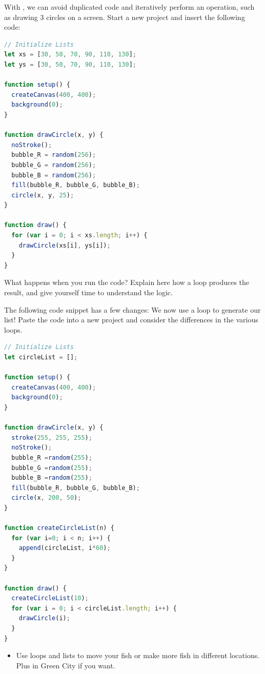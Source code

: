 \begin{exercisebox}[adjusted title= Introduction to Lists and For Loops]
With , we can avoid duplicated code and iteratively perform an operation, such as drawing 3 circles on a screen.
Start a new project and insert the following code:

\begin{lstlisting}[language=JavaScript]
// Initialize Lists
let xs = [30, 50, 70, 90, 110, 130];
let ys = [30, 50, 70, 90, 110, 130];

function setup() {
  createCanvas(400, 400);
  background(0);
}

function drawCircle(x, y) {
  noStroke();
  bubble_R = random(256);
  bubble_G = random(256);
  bubble_B = random(256);
  fill(bubble_R, bubble_G, bubble_B);
  circle(x, y, 25);
}

function draw() {
  for (var i = 0; i < xs.length; i++) {
    drawCircle(xs[i], ys[i]);
  }
}
\end{lstlisting}

What happens when you run the code? Explain here how a loop produces the result, and give yourself time to understand the logic.

\end{exercisebox}

\begin{exercisebox}[adjusted title= More with Lists and For Loops]
The following code snippet has a few changes: We now use a loop to generate our list! Paste the code into a new project and consider the differences in the various loops.

\begin{lstlisting}[language=JavaScript]
// Initialize Lists
let circleList = [];

function setup() {
  createCanvas(400, 400);
  background(0);
}

function drawCircle(x, y) {
  stroke(255, 255, 255);
  noStroke();
  bubble_R =random(255);
  bubble_G =random(255);
  bubble_B =random(255);
  fill(bubble_R, bubble_G, bubble_B);
  circle(x, 200, 50);
}

function createCircleList(n) {
  for (var i=0; i < n; i++) {
    append(circleList, i*60);
  }
}

function draw() {
  createCircleList(10);
  for (var i = 0; i < circleList.length; i++) {
    drawCircle(i);
  }
}
\end{lstlisting}

\noindent

\vspace{2mm}
\noindent

\begin{itemize}
  \item Use loops and lists to move your fish or make more fish in different locations. Plus in Green City if you want.
\end{itemize}
\end{exercisebox}